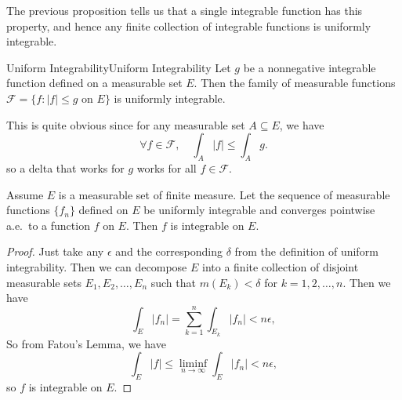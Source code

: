 \documentclass[../main.tex]{subfiles}
\begin{document}
The previous proposition tells us that a single integrable function has this property, and hence any finite collection of integrable functions is uniformly integrable.

\begin{example}{Uniform Integrability}{Uniform Integrability}
	Let $g$ be a nonnegative integrable function defined on a measurable set $E$. Then the family of measurable functions $\mathcal{F} = \{ f : |f| \leq g \text{ on } E \}$ is uniformly integrable.

	This is quite obvious since for any measurable set $A \subseteq E$, we have
	\begin{equation*}
		\forall f \in \mathcal{F}, \quad \int_A |f| \leq \int_A g.
	\end{equation*}
	so a delta that works for $g$ works for all $f \in \mathcal{F}$.
\end{example}

\begin{proposition}{}{}
	Assume $E$ is a measurable set of finite measure. Let the sequence of measurable functions $\{ f_n \}$ defined on $E$ be uniformly integrable and converges pointwise a.e.\ to a function $f$ on $E$. Then $f$ is integrable on $E$.
\end{proposition}
\begin{proof}
	Just take any $\epsilon$ and the corresponding $\delta$ from the definition of uniform integrability. Then we can decompose $E$ into a finite collection of disjoint measurable sets $E_1, E_2, \ldots, E_n$ such that $m(E_k) < \delta$ for $k = 1, 2, \ldots, n$. Then we have
	\begin{equation*}
		\int_E |f_n| = \sum_{k=1}^{n} \int_{E_k} |f_n| < n \epsilon,
	\end{equation*}
	So from Fatou's Lemma, we have
	\begin{equation*}
		\int_E |f| \leq \liminf_{n \to \infty} \int_E |f_n| < n \epsilon,
	\end{equation*}
	so $f$ is integrable on $E$.
\end{proof}
\end{document}
